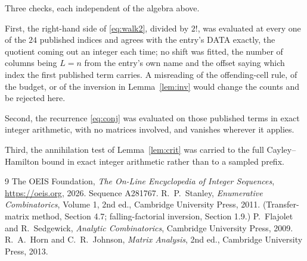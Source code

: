 \documentclass[11pt,a4paper]{article}
\theoremstyle{plain}
\theoremstyle{definition}
\begin{document}
Three checks, each independent of the algebra above.

First, the right-hand side of \eqref{eq:walk2}, divided by $2!$, was evaluated at every
one of the $24$ published indices and agrees with the entry's DATA exactly, the quotient
coming out an integer each time; no shift was fitted, the number of columns being
$L=n$ from the entry's own name and the offset saying which index the first published
term carries. A misreading of the offending-cell rule, of the budget, or of the inversion in
Lemma~\ref{lem:inv} would change the counts and be rejected here.

Second, the recurrence \eqref{eq:conj} was evaluated on those published terms in exact
integer arithmetic, with no matrices involved, and vanishes wherever it applies.

Third, the annihilation test of Lemma~\ref{lem:crit} was carried to the full
Cayley--Hamilton bound in exact integer arithmetic rather than to a sampled prefix.

\begin{thebibliography}{9}
 The OEIS Foundation, \emph{The On-Line Encyclopedia of Integer
Sequences}, \url{https://oeis.org}, 2026. Sequence A281767.
 R.~P.~Stanley, \emph{Enumerative Combinatorics}, Volume 1, 2nd ed.,
Cambridge University Press, 2011. (Transfer-matrix method, Section 4.7; falling-factorial
inversion, Section 1.9.)
 P.~Flajolet and R.~Sedgewick, \emph{Analytic Combinatorics}, Cambridge
University Press, 2009.
 R.~A.~Horn and C.~R.~Johnson, \emph{Matrix Analysis}, 2nd ed., Cambridge
University Press, 2013.
\end{thebibliography}
\end{document}
